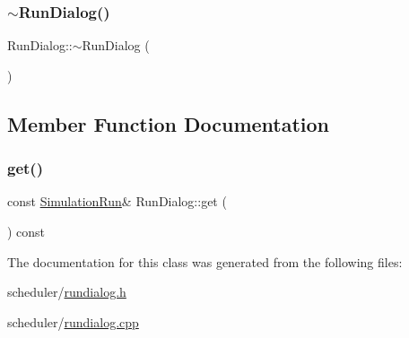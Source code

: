 \mbox{\label{class_run_dialog_adff87d89fbb214d424e26f929956d02b}} 
\subsubsection{\texorpdfstring{$\sim$RunDialog()}{~RunDialog()}}
{\footnotesize\ttfamily Run\+Dialog\+::$\sim$\+Run\+Dialog (\begin{DoxyParamCaption}{ }\end{DoxyParamCaption})}



\subsection{Member Function Documentation}
\mbox{\label{class_run_dialog_ac2150b4c80c368023f74cdad8d10c455}} 
\subsubsection{\texorpdfstring{get()}{get()}}
{\footnotesize\ttfamily const \mbox{\hyperlink{class_simulation_run}{Simulation\+Run}}\& Run\+Dialog\+::get (\begin{DoxyParamCaption}{ }\end{DoxyParamCaption}) const\hspace{0.3cm}{\ttfamily [inline]}}



The documentation for this class was generated from the following files\+:\begin{DoxyCompactItemize}
\item 
scheduler/\mbox{\hyperlink{rundialog_8h}{rundialog.\+h}}\item 
scheduler/\mbox{\hyperlink{rundialog_8cpp}{rundialog.\+cpp}}\end{DoxyCompactItemize}
